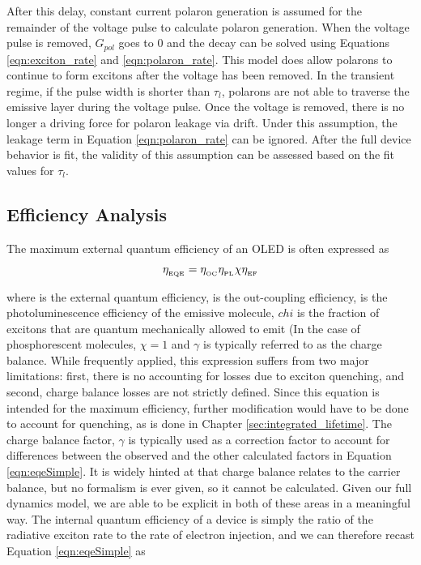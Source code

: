 \documentclass[../thesis.tex]{subfiles}
\begin{document}
After this delay, constant current polaron generation is assumed for the remainder of the voltage pulse to calculate polaron generation.  
When the voltage pulse is removed, $G_{pol}$ goes to 0 and the decay can be solved using Equations \ref{eqn:exciton_rate} and \ref{eqn:polaron_rate}.
This model does allow polarons to continue to form excitons after the voltage has been removed.
In the transient regime, if the pulse width is shorter than $\tau_l$, polarons are not able to traverse the emissive layer during the voltage pulse.  
Once the voltage is removed, there is no longer a driving force for polaron leakage via drift.
Under this assumption, the leakage term in Equation \ref{eqn:polaron_rate} can be ignored.
After the full device behavior is fit, the validity of this assumption can be assessed based on the fit values for $\tau_l$.



\subsection{Efficiency Analysis}

The maximum external quantum efficiency of an OLED is often expressed as\supercite{Baldo1998a,Rothberg1996}

\begin{equation}
\eta_{_\text{\tiny EQE}}=\eta_{_\text{\tiny OC}} \eta_{_\text{\tiny PL}} \chi \eta_{_\text{\tiny EF}}
\label{eqn:eqeSimple}
\end{equation}

where \eqe is the external quantum efficiency, \oc is the out-coupling efficiency, \pl is the photoluminescence efficiency of the emissive molecule, $chi$ is the fraction of excitons that are quantum mechanically allowed to emit (In the case of phosphorescent molecules, $\chi=1$ and $\gamma$ is  typically referred to as the charge balance.
While frequently applied, this expression suffers from two major limitations: first, there is no accounting for losses due to exciton quenching, and second, charge balance losses are not strictly defined.  
Since this equation is intended for the maximum efficiency, further modification would have to be done to account for quenching, as is done in Chapter \ref{sec:integrated_lifetime}.
The charge balance factor, $\gamma$ is typically used as a correction factor to account for differences between the observed \eqe and the other calculated factors in Equation \ref{eqn:eqeSimple}.
It is widely hinted at that charge balance relates to the carrier balance, but no formalism is ever given, so it cannot be calculated.
Given our full dynamics model, we are able to be explicit in both of these areas in a meaningful way.  
The internal quantum efficiency of a device is simply the ratio of the radiative exciton rate to the rate of electron injection, and we can therefore recast Equation \ref{eqn:eqeSimple} as
\end{document}
